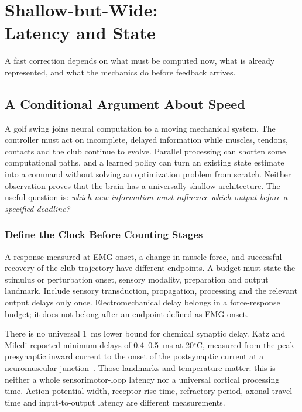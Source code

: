 \chapter[Shallow-but-Wide: Latency and State]{Shallow-but-Wide:\\Latency and State}
\label{ch:shallow-wide}

\epigraph{A fast correction depends on what must be computed now,
what is already represented, and what the mechanics do before feedback arrives.}{}

\section{A Conditional Argument About Speed}

A golf swing joins neural computation to a moving mechanical system. The controller
must act on incomplete, delayed information while muscles, tendons, contacts and
the club continue to evolve. Parallel processing can shorten some computational
paths, and a learned policy can turn an existing state estimate into a command
without solving an optimization problem from scratch. Neither observation proves
that the brain has a universally shallow architecture. The useful question is:
\emph{which new information must influence which output before a specified deadline?}

\subsection{Define the Clock Before Counting Stages}

A response measured at EMG onset, a change in muscle force, and successful recovery
of the club trajectory have different endpoints. A budget must state the stimulus
or perturbation onset, sensory modality, preparation and output landmark. Include
sensory transduction, propagation, processing and the relevant output delays only
once. Electromechanical delay belongs in a force-response budget; it does not
belong after an endpoint defined as EMG onset.

There is no universal 1~ms lower bound for chemical synaptic delay. Katz and
Miledi reported minimum delays of 0.4--0.5~ms at 20$^\circ$C, measured from the
peak presynaptic inward current to the onset of the postsynaptic current at a
neuromuscular junction~\cite{katzMiledi1965review}. Those landmarks and temperature
matter: this is neither a whole sensorimotor-loop latency nor a universal cortical
processing time. Action-potential width, receptor rise time, refractory period,
axonal travel time and input-to-output latency are different measurements.

